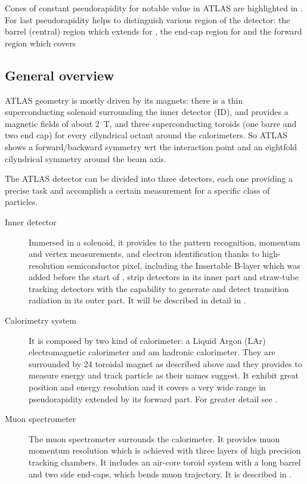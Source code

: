 Cones of constant pseudorapidity for notable value in ATLAS are highlighted in \Fig{\ref{fig:pseudorapidita}}. For last pseudorapidity helps to distinguish various region of the detector: the barrel (central) region which extends for , the  end-cap region for  and the forward region which covers 




\subsection{General overview}
ATLAS geometry is mostly driven by its magnets: there is a thin superconducting solenoid surrounding the inner detector (ID), and provides a magnetic fields of about \SI{2}{T}, and three superconducting toroids (one barre and two end cap) for every cilyndrical octant around the calorimeters. So ATLAS shows a forward/backward symmetry wrt the interaction point and an eightfold cilyndrical symmetry around the beam axis.

The ATLAS detector can be divided into three detectors, each one providing a precise task and accomplish a certain measurement for a specific class of particles.
\begin{description}
\item[Inner detector] Immersed in a solenoid, it provides to the pattern recognition, momentum and vertex measurements, and electron identification thanks to high-resolution semiconductor pixel, including the Insertable B-layer which was added before the start of \RunTwo, strip detectors in its inner part and straw-tube tracking detectors with the capability to generate and detect transition radiation in its outer part. It will be described in detail in \Sect{\ref{sec:ID}}.
\item[Calorimetry system] It is composed by two kind of calorimeter: a Liquid Argon (LAr) electromagnetic calorimeter and am hadronic calorimeter. They are surrounded by \num{24} toroidal magnet as described above and they provides to measure energy and track particle as their names suggest. It exhibit great position and energy resolution and it covers a very wide range in pseudorapidity extended by its forward part. For greater detail see \Sect{\ref{sec:calo}}.
\item[Muon spectrometer] The muon spectrometer surrounds the calorimeter. It provides muon momentum resolution which is achieved with three layers of high precision tracking chambers. It includes an air-core toroid system with a long barrel and two side end-caps, which bends muon trajectory. It is described in \Sect{\ref{sec:muons}}.

\end{description}

